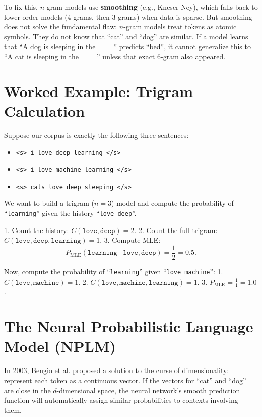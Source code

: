 To fix this, $n$-gram models use \textbf{smoothing} (e.g., Kneser-Ney), which falls back to lower-order models (4-grams, then 3-grams) when data is sparse. But smoothing does not solve the fundamental flaw: $n$-gram models treat tokens as atomic symbols. They do not know that ``cat'' and ``dog'' are similar. If a model learns that ``A dog is sleeping in the \_\_\_'' predicts ``bed'', it cannot generalize this to ``A cat is sleeping in the \_\_\_'' unless that exact 6-gram also appeared.

\section{Worked Example: Trigram Calculation}
\label{ch:08:sec:example}

Suppose our corpus is exactly the following three sentences:
\begin{itemize}
    \item \texttt{<s> i love deep learning </s>}
    \item \texttt{<s> i love machine learning </s>}
    \item \texttt{<s> cats love deep sleeping </s>}
\end{itemize}

We want to build a trigram ($n=3$) model and compute the probability of ``\texttt{learning}'' given the history ``\texttt{love deep}''.

1. Count the history: $C(\texttt{love}, \texttt{deep}) = 2$.
2. Count the full trigram: $C(\texttt{love}, \texttt{deep}, \texttt{learning}) = 1$.
3. Compute MLE:
\begin{equation}
    P_{\text{MLE}}(\texttt{learning} \mid \texttt{love}, \texttt{deep}) = \frac{1}{2} = 0.5.
\end{equation}

Now, compute the probability of ``\texttt{learning}'' given ``\texttt{love machine}'':
1. $C(\texttt{love}, \texttt{machine}) = 1$.
2. $C(\texttt{love}, \texttt{machine}, \texttt{learning}) = 1$.
3. $P_{\text{MLE}} = \frac{1}{1} = 1.0$.

\section{The Neural Probabilistic Language Model (NPLM)}

In 2003, Bengio et al. proposed a solution to the curse of dimensionality: represent each token as a continuous vector. If the vectors for ``cat'' and ``dog'' are close in the $d$-dimensional space, the neural network's smooth prediction function will automatically assign similar probabilities to contexts involving them.

